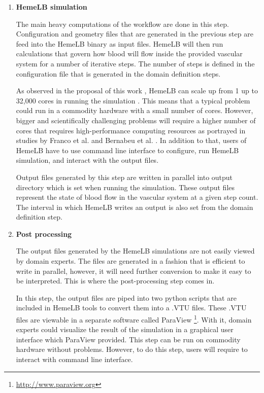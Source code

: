 \begin{enumerate}
\item{\textbf{HemeLB simulation}}

The main heavy computations of the workflow are done in this step.  Configuration and geometry files that are generated in the previous step are feed into the HemeLB binary as input files. HemeLB will then run calculations that govern how blood will flow inside the provided vascular system for a number of iterative steps. The number of steps is defined in the configuration file that is generated in the domain definition steps. 

As observed in the proposal of this work \citep{Steven:2016aa}, HemeLB can scale up from 1 up to 32,000 cores in running the simulation \citep{groen2013analysing}. This means that a typical problem could run in a commodity hardware with a small number of cores. However, bigger and scientifically challenging problems will require a higher number of cores that requires high-performance computing resources as portrayed in studies by Franco et al. \cite{franco2016non, franco2015dynamic} and Bernabeu et al. \cite{bernabeu2015characterization}. In addition to that, users of HemeLB have to use command line interface to configure, run HemeLB simulation, and interact with the output files. 

Output files generated by this step are written in parallel into output directory which is set when running the simulation. These output files represent the state of blood flow in the vascular system at a given step count. The interval in which HemeLB writes an output is also set from the domain definition step.

\item{\textbf{Post processing}}

The output files generated by the HemeLB simulations are not easily viewed by domain experts. The files are generated in a fashion that is efficient to write in parallel, however, it will need further conversion to make it easy to be interpreted. This is where the post-processing step comes in.  

In this step, the output files are piped into two python scripts that are included in HemeLB tools to convert them into a .VTU files. These .VTU files are viewable in a separate software called ParaView \footnote{\url{http://www.paraview.org}}. With it, domain experts could visualize the result of the simulation in a graphical user interface which ParaView provided. This step can be run on commodity hardware without problems. However, to do this step, users will require to interact with command line interface.

\end{enumerate}

